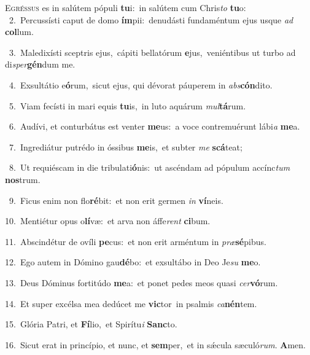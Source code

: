 \lettrine{\initial\textcolor{\initialcolor}{E}}{gréssus} es in salútem pópuli \textbf{tu}\-i:~\star in salútem cum Chris\textit{to} \textbf{tu}\-o:\\
{\numbfont\textcolor{\numbcolor}{~2.}}~Percussísti caput de domo \textbf{ím}\-pii:~\star denudásti fundaméntum ejus usque \textit{ad} \textbf{col}\-lum.\par
{\numbfont\textcolor{\numbcolor}{~3.}}~Maledixísti sceptris ejus,~\dagger cápiti bellatórum \textbf{e}\-jus,~\star veniéntibus ut turbo ad di\-\textit{sper}\-\textbf{gén}dum me.\par
{\numbfont\textcolor{\numbcolor}{~4.}}~Exsultátio e\-\textbf{ó}\-rum,~\star sicut ejus, qui dévorat páuperem in \textit{abs}\-\textbf{cón}dito.\par
{\numbfont\textcolor{\numbcolor}{~5.}}~Viam fecísti in mari equis \textbf{tu}\-is,~\star in luto aquárum \textit{mul}\-\textbf{tá}rum.\par
{\numbfont\textcolor{\numbcolor}{~6.}}~Audívi, et conturbátus est venter \textbf{me}\-us:~\star a voce contremuérunt lábi\textit{a} \textbf{me}\-a.\par
{\numbfont\textcolor{\numbcolor}{~7.}}~Ingrediátur putrédo in óssibus \textbf{me}\-is,~\star et subter \textit{me} \textbf{scá}\-teat;\par
{\numbfont\textcolor{\numbcolor}{~8.}}~Ut requiéscam in die tribulati\-\textbf{ó}\-nis:~\star ut ascéndam ad pópulum accínc\textit{tum} \textbf{nos}\-trum.\par
{\numbfont\textcolor{\numbcolor}{~9.}}~Ficus enim non flo\-\textbf{ré}\-bit:~\star et non erit germen \textit{in} \textbf{ví}\-neis.\par
{\numbfont\textcolor{\numbcolor}{10.}}~Mentiétur opus o\-\textbf{lí}\-væ:~\star et arva non áffe\textit{rent} \textbf{ci}\-bum.\par
{\numbfont\textcolor{\numbcolor}{11.}}~Abscindétur de ovíli \textbf{pe}\-cus:~\star et non erit arméntum in \textit{præ}\-\textbf{sé}pibus.\par
{\numbfont\textcolor{\numbcolor}{12.}}~Ego autem in Dómino gau\-\textbf{dé}\-bo:~\star et exsultábo in Deo Je\textit{su} \textbf{me}\-o.\par
{\numbfont\textcolor{\numbcolor}{13.}}~Deus Dóminus fortitúdo \textbf{me}\-a:~\star et ponet pedes meos quasi \textit{cer}\-\textbf{vó}rum.\par
{\numbfont\textcolor{\numbcolor}{14.}}~Et super excélsa mea dedúcet me \textbf{vic}\-tor~\star in psalmis \textit{ca}\-\textbf{nén}tem.\par
{\numbfont\textcolor{\numbcolor}{15.}}~Glória Patri, et \textbf{Fí}\-lio,~\star et Spirítu\textit{i} \textbf{Sanc}\-to.\par
{\numbfont\textcolor{\numbcolor}{16.}}~Sicut erat in princípio, et nunc, et \textbf{sem}\-per,~\star et in sǽcula sæculó\-\textit{rum}\-. \textbf{A}\-men.\par
